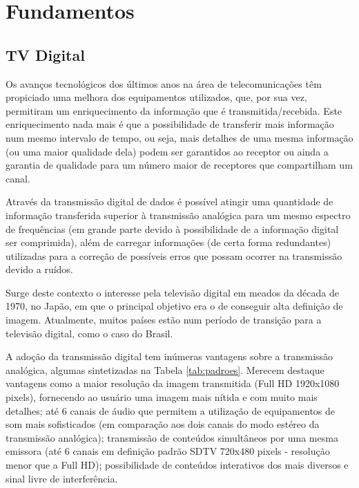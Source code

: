 \chapter{Fundamentos}

\section{TV Digital}

Os avanços tecnológicos dos últimos anos na área de telecomunicações têm propiciado uma melhora dos equipamentos utilizados, que, por sua vez, permitiram um enriquecimento da informação que é transmitida/recebida. Este enriquecimento nada mais é que a possibilidade de transferir mais informação num mesmo intervalo de tempo, ou seja, mais detalhes de uma mesma informação (ou uma maior qualidade dela) podem ser garantidos ao receptor ou ainda a garantia de qualidade para um número maior de receptores que compartilham um canal.

Através da transmissão digital de dados é possível atingir uma quantidade de informação transferida superior à transmissão analógica para um mesmo espectro de frequências (em grande parte devido à possibilidade de a informação digital ser comprimida), além de carregar informações (de certa forma redundantes) utilizadas para a correção de possíveis erros que possam ocorrer na transmissão devido a ruídos.

Surge deste contexto o interesse pela televisão digital em meados da década de 1970, no Japão, em que o principal objetivo era o de conseguir alta definição de imagem. Atualmente, muitos países estão num período de transição para a televisão digital, como o caso do Brasil.

A adoção da transmissão digital tem inúmeras vantagens sobre a transmissão analógica, algumas sintetizadas na Tabela \ref{tab:padroes}. Merecem destaque vantagens como a maior resolução da imagem transmitida (Full HD 1920x1080 pixels), fornecendo ao usuário uma imagem mais nítida e com muito mais detalhes; até 6 canais de áudio que permitem a utilização de equipamentos de som mais sofisticados (em comparação aos dois canais do modo estéreo da transmissão analógica); transmissão de conteúdos simultâneos por uma mesma emissora (até 6 canais em definição padrão SDTV 720x480 pixels - resolução menor que a Full HD); possibilidade de conteúdos interativos dos mais diversos e sinal livre de interferência.

